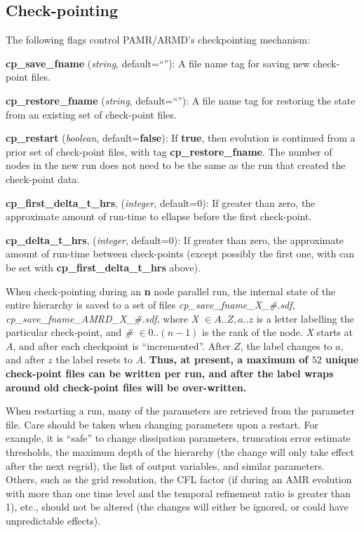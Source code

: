 \documentclass[aps,amssymb,unsortedaddress,nofootinbib]{revtex4}
\def\lsep{\itemsep 0.05in}
\begin{document}
\subsection{Check-pointing}\label{sec_cp}

The following flags control PAMR/ARMD's checkpointing mechanism:
\begin{list}{}{\lsep}
\item {\bf cp\_save\_fname} ({\em string}, default=``''): A file name tag for saving new check-point files.
\item {\bf cp\_restore\_fname} ({\em string}, default=``''): A file name tag for restoring the state from an existing
      set of check-point files.
\item {\bf cp\_restart} ({\em boolean}, default={\bf false}): If {\bf true}, then 
      evolution is continued from a prior set of check-point files, with tag {\bf cp\_restore\_fname}.
      The number of nodes in the new run does not need to be the same as the run that created the check-point data.
\item {\bf cp\_first\_delta\_t\_hrs}, ({\em integer}, default=0): If greater than zero, the approximate
      amount of run-time to ellapse before the first check-point.
\item {\bf cp\_delta\_t\_hrs}, ({\em integer}, default=0): If greater than zero, the approximate
      amount of run-time between check-points (except possibly the first one, with can be set 
      with {\bf cp\_first\_delta\_t\_hrs} above).
\end{list}
When check-pointing
during an {\bf n} node parallel run, the internal state of the entire hierarchy
is saved to a set of files {\it cp\_save\_fname\_X\_\#.sdf, cp\_save\_fname\_AMRD\_X\_\#.sdf},
where {\it X $\in A..Z,a..z$} is a letter labelling the particular check-point, and
{\it \# $\in0..(n-1)$} is the rank of the node. {\it X} starts at $A$, and
after each checkpoint is ``incremented''. After $Z$, the label changes to $a$, and after $z$
the label resets to $A$. {\bf Thus, at present, a maximum of $52$ unique check-point files can
be written per run, and after the label wraps around old check-point files will be
over-written.}

When restarting a run, many of the parameters are retrieved from the parameter file.
Care should be taken when changing parameters upon a restart. For example, it is
``safe'' to change dissipation parameters, truncation error estimate thresholds,
the maximum depth of the hierarchy (the change will only take effect after
the next regrid), the list of output variables, and similar parameters. Others,
such as the grid resolution, the CFL factor (if during an AMR evolution with
more than one time level and the temporal refinement ratio is greater than 1),
etc., should not be altered (the changes will either be
ignored, or could have unpredictable effects). 
\end{document}
